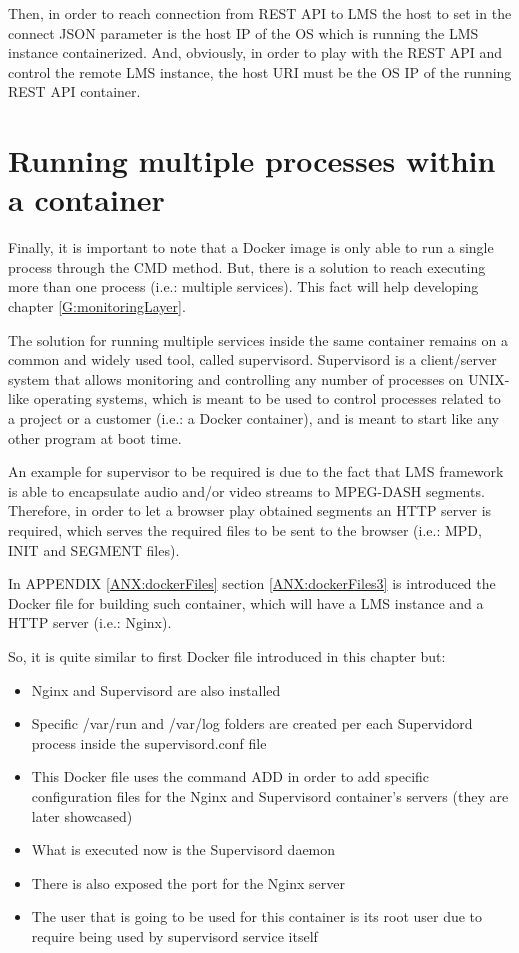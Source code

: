 Then, in order to reach connection from REST API to LMS the host to set in the connect JSON parameter is the host IP of the OS which is running the LMS instance containerized. And, obviously, in order to play with the REST API and control the remote LMS instance, the host URI must be the OS IP of the running REST API container.

\section{Running multiple processes within a container}

Finally, it is important to note that a Docker image is only able to run a single process through the CMD method. But, there is a solution to reach executing more than one process (i.e.: multiple services). This fact will help developing chapter \ref{G:monitoringLayer}.

The solution for running multiple services inside the same container remains on a common and widely used tool, called supervisord. Supervisord is a client/server system that allows monitoring and controlling any number of processes on UNIX-like operating systems, which is meant to be used to control processes related to a project or a customer (i.e.: a Docker container), and is meant to start like any other program at boot time.

An example for supervisor to be required is due to the fact that LMS framework is able to encapsulate audio and/or video streams to MPEG-DASH segments. Therefore, in order to let a browser play obtained segments an HTTP server is required, which serves the required files to be sent to the browser (i.e.: MPD, INIT and SEGMENT files).

In APPENDIX \ref{ANX:dockerFiles} section \ref{ANX:dockerFiles3} is introduced the Docker file for building such container, which will have a LMS instance and a HTTP server (i.e.: Nginx).

So, it is quite similar to first Docker file introduced in this chapter but:

\begin{itemize}
\item Nginx and Supervisord are also installed
\item Specific /var/run and /var/log folders are created per each Supervidord process inside the supervisord.conf file
\item This Docker file uses the command ADD in order to add specific configuration files for the Nginx and Supervisord container's servers (they are later showcased)
\item What is executed now is the Supervisord daemon
\item There is also exposed the port for the Nginx server
\item The user that is going to be used for this container is its root user due to require being used by supervisord service itself
\end{itemize}

